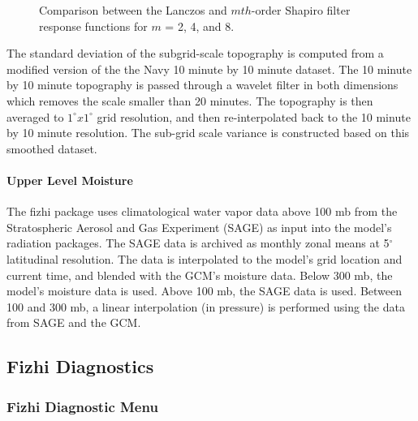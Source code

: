 \begin{figure*}[htbp]
  \centerline{  \epsfysize=7.0in  }
  \caption{ \label{fig:fizhi:lanczos} Comparison between the Lanczos and $mth$-order Shapiro filter 
  response functions for $m$ = 2, 4, and 8. }
\end{figure*}

The standard deviation of the subgrid-scale topography
is computed from a modified version of the the Navy 10 minute by 10 minute dataset.
The 10 minute by 10 minute topography is passed through a wavelet
filter in both dimensions which removes the scale smaller than 20 minutes.
The topography is then averaged to $1^\circ x 1^\circ$ grid resolution, and then
re-interpolated back to the 10 minute by 10 minute resolution. 
The sub-grid scale variance is constructed based on this smoothed dataset.


\paragraph{Upper Level Moisture}
The fizhi package uses climatological water vapor data above 100 mb from the Stratospheric Aerosol and Gas 
Experiment (SAGE) as input into the model's radiation packages.  The SAGE data is archived
as monthly zonal means at 5$^\circ$ latitudinal resolution.  The data is interpolated to the
model's grid location and current time, and blended with the GCM's moisture data.  Below 300 mb,
the model's moisture data is used.  Above 100 mb, the SAGE data is used.  Between 100 and 300 mb,
a linear interpolation (in pressure) is performed using the data from SAGE and the GCM. 


\subsection{Fizhi Diagnostics}

\subsubsection{Fizhi Diagnostic Menu}
\label{sec:fizhi-diagnostics:menu}

